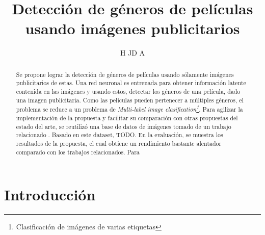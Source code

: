 \documentclass[]{article}
\title{Detecci\'on de g\'eneros de pel\'iculas usando im\'agenes publicitarios}
\author{H JD A}
\begin{document}
\maketitle

\begin{abstract}
Se propone lograr la detecci\'on de g\'eneros de pel\'iculas usando s\'olamente im\'agenes publicitarios de estas. Una red neuronal es entrenada para obtener informaci\'on latente contenida en las im\'agenes y usando estos, detectar  los g\'eneros de una pel\'icula, dado una imagen publicitaria. Como las pel\'iculas pueden pertenecer a m\'ultiples g\'eneros, el problema se reduce a un problema de \textit{Multi-label image clasification\footnote{Clasificaci\'on de im\'agenes de varias etiquetas}}. Para agilizar la implementaci\'on de la propuesta y facilitar su comparaci\'on con otras propuestas del estado del arte, se reutiliz\'o una base de datos de im\'agenes tomado de un trabajo relacionado \cite{weitachu}. Basado en este dataset, {TODO}. En la evaluaci\'on, se muestra los resultados de la propuesta, el cual obtiene un rendimiento bastante alentador comparado con los trabajos relacionados. Para
\end{abstract}

\section{Introducci\'on}

\newpage


\end{document}
